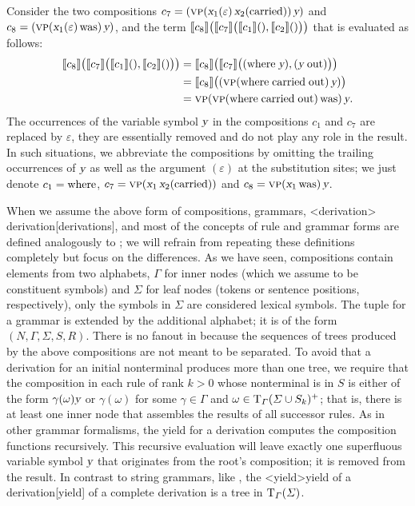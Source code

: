 \documentclass[../../document.tex]{subfiles}
\begin{document}
\begin{example}
        Consider the two compositions \(c_7 = (\textsc{vp}(\textsl{x}_1(\varepsilon) \, \textsl{x}_2(\text{carried}))\,\textsl{y})\) and \(c_8 = (\textsc{vp}(\textsl{x}_1(\varepsilon) \, \text{was})\,\textsl{y})\), and the term \(\llbracket c_8\rrbracket\big( \llbracket c_7\rrbracket\big(\llbracket c_1\rrbracket(), \llbracket c_2\rrbracket()\big) \big)\) that is evaluated as follows:
        \begin{align*}
            \llbracket c_8\rrbracket\big( \llbracket c_7\rrbracket\big(\llbracket c_1\rrbracket(), \llbracket c_2\rrbracket()\big) \big)
            &= \llbracket c_8\rrbracket\big( \llbracket c_7\rrbracket\big((\text{where} \; \textsl{y}), (\textsl{y} \; \text{out})\big) \big)\\
            &= \llbracket c_8\rrbracket\big( (\textsc{vp}(\text{where} \; \text{carried} \; \text{out} )\,\textsl{y})  \big)\\
            &= \textsc{vp} (\textsc{vp}(\text{where} \; \text{carried} \;\text{out} )\, \text{was})\,\textsl{y}\text{.}
        \end{align*}
        The occurrences of the variable symbol \(\textsl{y}\) in the compositions \(c_1\) and \(c_7\) are replaced by \(\varepsilon\), they are essentially removed and do not play any role in the result.
        In such situations, we abbreviate the compositions by omitting the trailing occurrences of $\textsl{y}$ as well as the argument \((\varepsilon)\) at the substitution sites; we just denote \(c_1 = \text{where}\), \(c_7 = \textsc{vp}(\textsl{x}_1 \, \textsl{x}_2(\text{carried}))\) and \(c_8 = \textsc{vp}(\textsl{x}_1\, \text{was})\,\textsl{y}\).
        \\\null\hfill\exampleqed
    \end{example}

    When we assume the above form of compositions,  grammars, <derivation>{ derivation}[derivations], and most of the concepts of rule and grammar forms are defined analogously to ; we will refrain from repeating these definitions completely but focus on the differences.
    As we have seen,  compositions contain elements from two alphabets, \(\varGamma\) for inner nodes (which we assume to be constituent symbols) and  \(\varSigma\) for leaf nodes (tokens or sentence positions, respectively), only the symbols in \(\varSigma\) are considered lexical symbols.
    The tuple for a  grammar is extended by the additional alphabet; it is of the form \((N, \varGamma, \varSigma, S, R)\).
    There is no fanout in  because the sequences of trees produced by the above compositions are not meant to be separated.
    To avoid that a derivation for an initial nonterminal produces more than one tree, we require that the composition in each rule of rank \(k>0\) whose  nonterminal is in \(S\) is either of the form \(\gamma( \omega) \textsl{y}\) or \(\gamma(\omega)\) for some \(\gamma \in \varGamma\) and \(\omega \in \operatorname{T}_\varGamma(\varSigma \cup S_k)^+\); that is, there is at least one inner node that assembles the results of all successor rules.
    As in other grammar formalisms, the yield for a derivation computes the composition functions recursively.
    This recursive evaluation will leave exactly one superfluous variable symbol \(\textsl{y}\) that originates from the root's composition; it is removed from the result.
    In contrast to string grammars, like , the <yield>{yield of a  derivation}[yield] of a complete derivation is a tree in \(\operatorname{T}_\varGamma(\varSigma)\).
\end{document}
